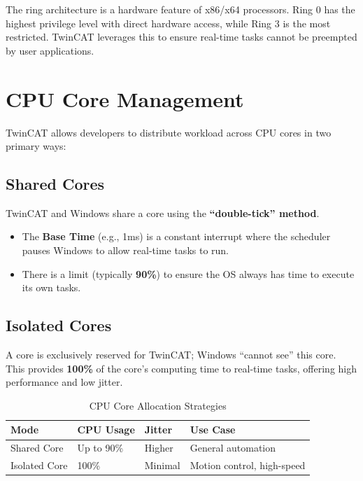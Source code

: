 \documentclass[11pt,a4paper]{article}
\begin{document}
\begin{notebox}
The ring architecture is a hardware feature of x86/x64 processors. Ring 0 has the highest privilege level with direct hardware access, while Ring 3 is the most restricted. TwinCAT leverages this to ensure real-time tasks cannot be preempted by user applications.
\end{notebox}

\section{CPU Core Management}

TwinCAT allows developers to distribute workload across CPU cores in two primary ways:

\subsection{Shared Cores}

TwinCAT and Windows share a core using the \textbf{``double-tick'' method}.

\begin{itemize}[leftmargin=*]
    \item The \textbf{Base Time} (e.g., 1ms) is a constant interrupt where the scheduler pauses Windows to allow real-time tasks to run.
    \item There is a limit (typically \textbf{90\%}) to ensure the OS always has time to execute its own tasks.
\end{itemize}

\subsection{Isolated Cores}

A core is exclusively reserved for TwinCAT; Windows ``cannot see'' this core. This provides \textbf{100\%} of the core's computing time to real-time tasks, offering high performance and low jitter.

\begin{table}[h]
\centering
\begin{tabular}{@{}llll@{}}
\toprule
\textbf{Mode} & \textbf{CPU Usage} & \textbf{Jitter} & \textbf{Use Case} \\
\midrule
Shared Core & Up to 90\% & Higher & General automation \\
Isolated Core & 100\% & Minimal & Motion control, high-speed \\
\bottomrule
\end{tabular}
\caption{CPU Core Allocation Strategies}
\end{table}
\end{document}
